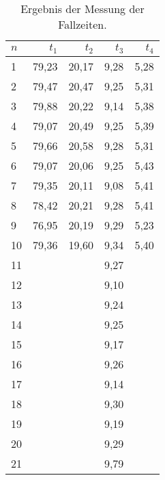             \begin{table}[H]
                \centering
                \caption{Ergebnis der Messung der Fallzeiten.}
                \vspace*{.5em}
                \begin{tabular}{|l||r|r|r|r|}
                    \hline
                    $n$ & $t_{1}$ & $t_{2}$ & $t_{3}$ & $t_{4}$\\
                    \hline \hline
                    1 & 79,23    & 20,17    & 9,28    & 5,28\\
                    2 & 79,47    & 20,47    & 9,25    & 5,31\\
                    3 & 79,88    & 20,22    & 9,14    & 5,38\\
                    4 & 79,07    & 20,49    & 9,25    & 5,39\\
                    5 & 79,66    & 20,58    & 9,28    & 5,31\\
                    6 & 79,07    & 20,06    & 9,25    & 5,43\\
                    7 & 79,35    & 20,11    & 9,08    & 5,41\\
                    8 & 78,42    & 20,21    & 9,28    & 5,41\\
                    9 & 76,95    & 20,19    & 9,29    & 5,23\\
                    10 & 79,36   & 19,60    & 9,34    & 5,40\\
                    11 &         &          & 9,27    &     \\
                    12 &         &          & 9,10    &     \\
                    13 &         &          & 9,24    &     \\
                    14 &         &          & 9,25    &     \\
                    15 &         &          & 9,17    &     \\
                    16 &         &          & 9,26    &     \\
                    17 &         &          & 9,14    &     \\
                    18 &         &          & 9,30    &     \\
                    19 &         &          & 9,19    &     \\
                    20 &         &          & 9,29    &     \\
                    21 &         &          & 9,79    &     \\

\end{tabular}
\end{table}
